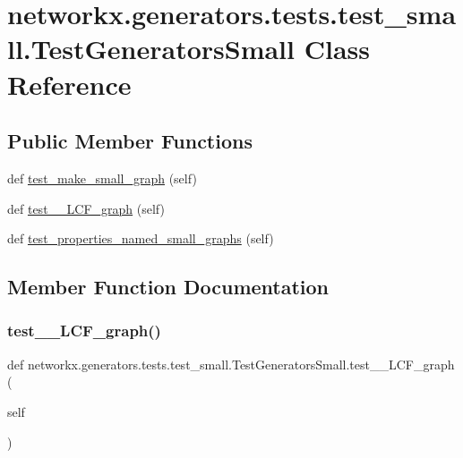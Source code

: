 \hypertarget{classnetworkx_1_1generators_1_1tests_1_1test__small_1_1TestGeneratorsSmall}{}\section{networkx.\+generators.\+tests.\+test\+\_\+small.\+Test\+Generators\+Small Class Reference}
\label{classnetworkx_1_1generators_1_1tests_1_1test__small_1_1TestGeneratorsSmall}
\subsection*{Public Member Functions}
\begin{DoxyCompactItemize}
\item 
def \hyperlink{classnetworkx_1_1generators_1_1tests_1_1test__small_1_1TestGeneratorsSmall_a9ee8a5d64b40e01e154043382816282a}{test\+\_\+make\+\_\+small\+\_\+graph} (self)
\item 
def \hyperlink{classnetworkx_1_1generators_1_1tests_1_1test__small_1_1TestGeneratorsSmall_a19b12b52eb733cbb9427b402be9f173b}{test\+\_\+\+\_\+\+L\+C\+F\+\_\+graph} (self)
\item 
def \hyperlink{classnetworkx_1_1generators_1_1tests_1_1test__small_1_1TestGeneratorsSmall_acc599b882d441b8d1b04586ac67b9ded}{test\+\_\+properties\+\_\+named\+\_\+small\+\_\+graphs} (self)
\end{DoxyCompactItemize}


\subsection{Member Function Documentation}
\mbox{\label{classnetworkx_1_1generators_1_1tests_1_1test__small_1_1TestGeneratorsSmall_a19b12b52eb733cbb9427b402be9f173b}} 
\subsubsection{\texorpdfstring{test\+\_\+\+\_\+\+L\+C\+F\+\_\+graph()}{test\_\_LCF\_graph()}}
{\footnotesize\ttfamily def networkx.\+generators.\+tests.\+test\+\_\+small.\+Test\+Generators\+Small.\+test\+\_\+\+\_\+\+L\+C\+F\+\_\+graph (\begin{DoxyParamCaption}\item[{}]{self }\end{DoxyParamCaption})}

